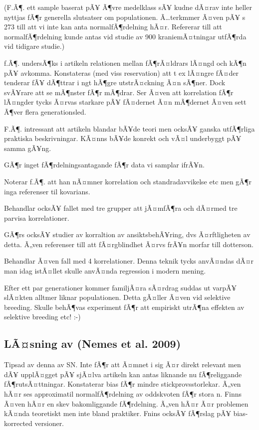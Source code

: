 \documentclass[]{article}
\begin{document}
(F.Ã¶. ett sample baserat pÃ¥ Ã¶vre medelklass sÃ¥ kudne dÃ¤rav inte
heller nyttjas fÃ¶r generella slutsatser om populationen.
Ã\ldots{}terkmmer Ã¤ven pÃ¥ s 273 till att vi inte kan anta
normalfÃ¶rdelning hÃ¤r. Refererar till att normalfÃ¶rdelning kunde antas
vid studie av 900 kraniemÃ¤tningar utfÃ¶rda vid tidigare studie.)

f.Ã¶. undersÃ¶ks i artikeln relationen mellan fÃ¶rÃ¤ldrars lÃ¤ngd och
kÃ¶n pÃ¥ avkomma. Konstateras (med viss reservation) att t ex lÃ¤ngre
fÃ¤der tenderar fÃ¥ dÃ¶ttrar i ngt hÃ¶gre utstrÃ¤ckning Ã¤n sÃ¶ner. Dock
svÃ¥rare att se mÃ¶nster fÃ¶r mÃ¶drar. Ser Ã¤ven att korrelation fÃ¶r
lÃ¤ngder tycks Ã¤rvas starkare pÃ¥ fÃ¤dernet Ã¤n mÃ¶dernet Ã¤ven sett
Ã¶ver flera generationsled.

F.Ã¶. intressant att artikeln blandar bÃ¥de teori men ocksÃ¥ ganska
utfÃ¶rliga praktiska beskrivningar. KÃ¤nns bÃ¥de konrekt och vÃ¤l
underbyggt pÃ¥ samma gÃ¥ng.

GÃ¶r inget fÃ¶rdelningsantagande fÃ¶r data vi samplar ifrÃ¥n.

Noterar f.Ã¶. att han nÃ¤mner korrelation och standradavvikelse etc men
gÃ¶r inga referenser til kovarians.

Behandlar ocksÃ¥ fallet med tre grupper att jÃ¤mfÃ¶ra och dÃ¤rmed tre
parvisa korrelationer.

GÃ¶rs ocksÃ¥ studier av korraltion av ansiktsbehÃ¥ring, dvs
Ã¤rftligheten av detta. Ã„ven referenser till att fÃ¤rgblindhet Ã¤rvs
frÃ¥n morfar till dotterson.

Behandlar Ã¤ven fall med 4 korrelationer. Denna teknik tycks anvÃ¤ndas
dÃ¤r man idag istÃ¤llet skulle anvÃ¤nda regression i modern mening.

Efter ett par generationer kommer familjÃ¤ra sÃ¤rdrag suddas ut varpÃ¥
slÃ¤kten alltmer liknar populationen. Detta gÃ¤ller Ã¤ven vid selektive
breeding. Skulle behÃ¶vas experiment fÃ¶r att empiriskt utrÃ¶na effekten
av selektive breeding etc! :-)

\subsection{LÃ¤sning av (Nemes et al. 2009)}\label{lasning-av-nemes2009}

Tipsad av denna av SN. Inte fÃ¶r att Ã¤mnet i sig Ã¤r direkt relevant
men dÃ¥ upplÃ¤gget pÃ¥ sjÃ¤lva artikeln kan antas liknande nu
fÃ¶religgande fÃ¶rutsÃ¤ttningar. Konstaterar bias fÃ¶r mindre
stickprovsstorlekar. Ã„ven hÃ¤r ses approximatil normalfÃ¶rdelning av
oddskvoten fÃ¶r stora n. Finns Ã¤ven hÃ¤r en skev bakomliggande
fÃ¶rdelning. Ã„ven hÃ¤r Ã¤r problemen kÃ¤nda teoretiskt men inte bland
praktiker. Fnins ocksÃ¥ fÃ¶rslag pÃ¥ bias-korrected versioner.
\end{document}
